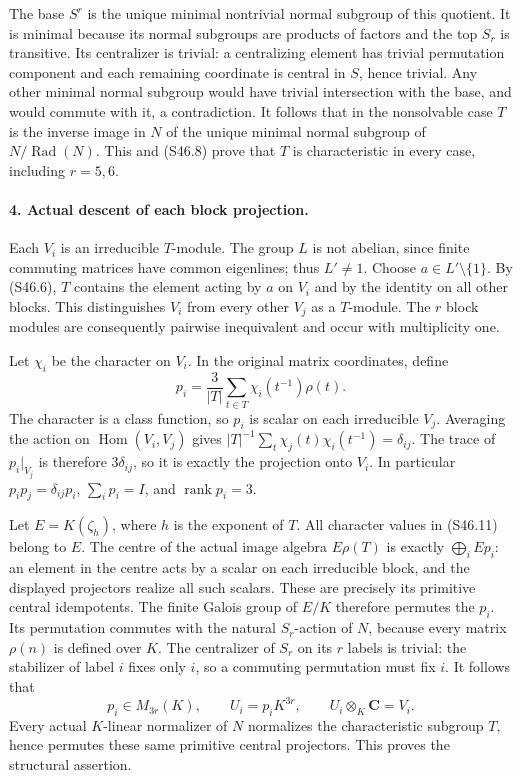 The base \(S^r\) is the unique minimal nontrivial normal
subgroup of this quotient. It is minimal because its normal
subgroups are products of factors and the top \(S_r\) is
transitive. Its centralizer is trivial: a centralizing element
has trivial permutation component and each remaining coordinate
is central in \(S\), hence trivial. Any other minimal normal
subgroup would have trivial intersection with the base, and
would commute with it, a contradiction. It follows that in
the nonsolvable case \(T\) is the inverse image in \(N\)
of the unique minimal normal subgroup of
\(N/\operatorname{Rad}(N)\). This and (S46.8) prove that
\(T\) is characteristic in every case, including \(r=5,6\).

\paragraph{4. Actual descent of each block projection.}
Each \(V_i\) is an irreducible \(T\)-module. The group \(L\)
is not abelian, since finite commuting matrices have common
eigenlines; thus \(L'\ne1\). Choose \(a\in L'\setminus\{1\}\).
By (S46.6), \(T\) contains the element acting by \(a\)
on \(V_i\) and by the identity on all other blocks. This
distinguishes \(V_i\) from every other \(V_j\) as a
\(T\)-module. The \(r\) block modules are consequently
pairwise inequivalent and occur with multiplicity one.

Let \(\chi_i\) be the character on \(V_i\). In the original
matrix coordinates, define
\[
       p_i=\frac{3}{|T|}\sum_{t\in T}\chi_i(t^{-1})\rho(t).
 \tag{S46.11}
\]
The character is a class function, so \(p_i\) is scalar on
each irreducible \(V_j\). Averaging the action on
\(\operatorname{Hom}(V_i,V_j)\) gives
\(|T|^{-1}\sum_t\chi_j(t)\chi_i(t^{-1})=\delta_{ij}\).
The trace of \(p_i|_{V_j}\) is therefore \(3\delta_{ij}\),
so it is exactly the projection onto \(V_i\). In particular
\(p_ip_j=\delta_{ij}p_i\), \(\sum_i p_i=I\), and
\(\operatorname{rank}p_i=3\).

Let \(E=K(\zeta_h)\), where \(h\) is the exponent of \(T\).
All character values in (S46.11) belong to \(E\). The centre
of the actual image algebra \(E\rho(T)\) is exactly
\(\bigoplus_i Ep_i\): an element in the centre acts by a
scalar on each irreducible block, and the displayed projectors
realize all such scalars. These are precisely its primitive
central idempotents. The finite Galois group of \(E/K\)
therefore permutes the \(p_i\). Its permutation commutes with
the natural \(S_r\)-action of \(N\), because every matrix
\(\rho(n)\) is defined over \(K\). The centralizer of
\(S_r\) on its \(r\) labels is trivial: the stabilizer
of label \(i\) fixes only \(i\), so a commuting permutation
must fix \(i\). It follows that
\[
       p_i\in M_{3r}(K),\qquad U_i=p_iK^{3r},\qquad
       U_i\otimes_K\mathbf C=V_i.
 \tag{S46.12}
\]
Every actual \(K\)-linear normalizer of \(N\) normalizes
the characteristic subgroup \(T\), hence permutes these same
primitive central projectors. This proves the structural assertion.

